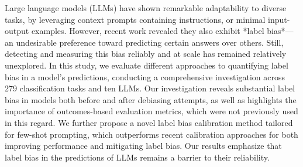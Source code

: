 Large language models (LLMs) have shown remarkable adaptability to diverse tasks, by leveraging context prompts containing instructions, or minimal input-output examples. However, recent work revealed they also exhibit *label bias*---an undesirable preference toward predicting certain answers over others. Still, detecting and measuring this bias reliably and at scale has remained relatively unexplored. In this study, we evaluate different approaches to quantifying label bias in a model's predictions, conducting a comprehensive investigation across 279 classification tasks and ten LLMs. Our investigation reveals substantial label bias in models both before and after debiasing attempts, as well as highlights the importance of outcomes-based evaluation metrics, which were not previously used in this regard. We further propose a novel label bias calibration method tailored for few-shot prompting, which outperforms recent calibration approaches for both improving performance and mitigating label bias. Our results emphasize that label bias in the predictions of LLMs remains a barrier to their reliability.